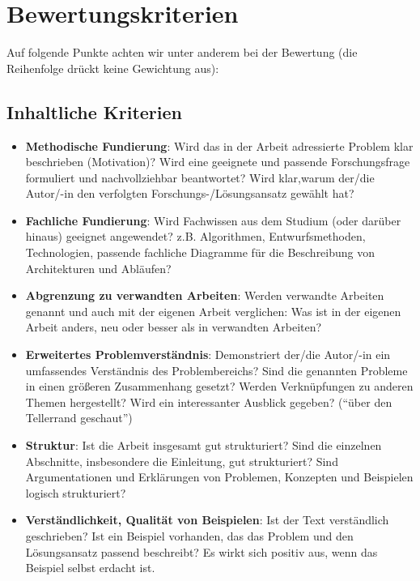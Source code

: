 \chapter{Bewertungskriterien}
\label{chap:bewertungskriterien}

Auf folgende Punkte achten wir unter anderem bei der Bewertung (die Reihenfolge drückt keine Gewichtung aus):

\section{Inhaltliche Kriterien}
\label{sec:inhaltliche-kriterien}

    \begin{itemize}
    
        \item \textbf{Methodische Fundierung}: Wird das in der Arbeit adressierte Problem klar beschrieben (Motivation)? Wird eine geeignete und passende Forschungsfrage formuliert und nachvollziehbar beantwortet? Wird klar,warum der/die Autor/-in den verfolgten Forschungs-/Lösungsansatz gewählt hat?
        
        \item \textbf{Fachliche Fundierung}: Wird Fachwissen aus dem Studium (oder darüber hinaus) geeignet angewendet? z.B. Algorithmen, Entwurfsmethoden, Technologien, passende fachliche Diagramme für die Beschreibung von Architekturen und Abläufen?
        
	    \item \textbf{Abgrenzung zu verwandten Arbeiten}: Werden verwandte Arbeiten genannt und auch mit der eigenen Arbeit verglichen: Was ist in der eigenen Arbeit anders, neu oder besser als in verwandten Arbeiten?
	    
	    \item \textbf{Erweitertes Problemverständnis}: Demonstriert der/die Autor/-in ein umfassendes Verständnis des Problembereichs? Sind die genannten Probleme in einen größeren Zusammenhang gesetzt? Werden Verknüpfungen zu anderen Themen hergestellt? Wird ein interessanter Ausblick gegeben? (\enquote{über den Tellerrand geschaut})
        
        \item \textbf{Struktur}: Ist die Arbeit insgesamt gut strukturiert? Sind die einzelnen Abschnitte, insbesondere die Einleitung, gut strukturiert? Sind Argumentationen und Erklärungen von Problemen, Konzepten und Beispielen logisch strukturiert?
	
		\item \textbf{Verständlichkeit, Qualität von Beispielen}: Ist der Text verständlich geschrieben? Ist ein Beispiel vorhanden, das das Problem und den Lösungsansatz passend beschreibt? Es wirkt sich positiv aus, wenn das Beispiel selbst erdacht ist.
		

\end{itemize}
